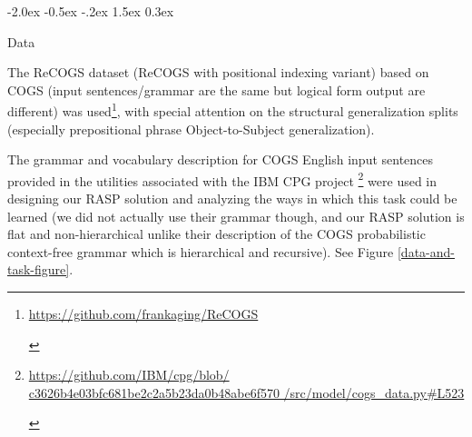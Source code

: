 \documentclass[11pt]{article}
\makeatletter
\renewcommand\section{\@startsection{section}{1}{\z@}%
                                  {-2.0ex \@plus -0.5ex \@minus -.2ex}%
                                  {1.5ex \@plus 0.3ex}%
                                  {\large\bfseries\raggedright}}
\makeatother
\begin{document}
%
%
%

\section{Data}

The ReCOGS \citep{Wu2023} dataset (ReCOGS with positional indexing variant) based on COGS \citep{KimLinzen2020} (input sentences/grammar are the same but logical form output are different) was used\footnote{\begin{footnotesize}\href{https://github.com/frankaging/ReCOGS}{https://github.com/frankaging/ReCOGS}\end{footnotesize}}, with special attention on the structural generalization splits (especially prepositional phrase Object-to-Subject generalization).

The grammar and vocabulary description for COGS English input sentences provided in the utilities associated with the IBM CPG project \citep{klinger2024compositionalprogramgenerationfewshot}\footnote{\begin{footnotesize}\href{https://github.com/IBM/cpg/blob/c3626b4e03bfc681be2c2a5b23da0b48abe6f570/src/model/cogs\_data.py\#L523}{https://github.com/IBM/cpg/blob/
c3626b4e03bfc681be2c2a5b23da0b48abe6f570
/src/model/cogs\_data.py\#L523}
\end{footnotesize}}
were used in designing our RASP solution and analyzing the ways in which this task could be learned (we did not actually use their grammar though, and our RASP solution is flat and non-hierarchical unlike their description of the COGS probabilistic context-free grammar which is hierarchical and recursive). See Figure \ref{data-and-task-figure}.
\end{document}
